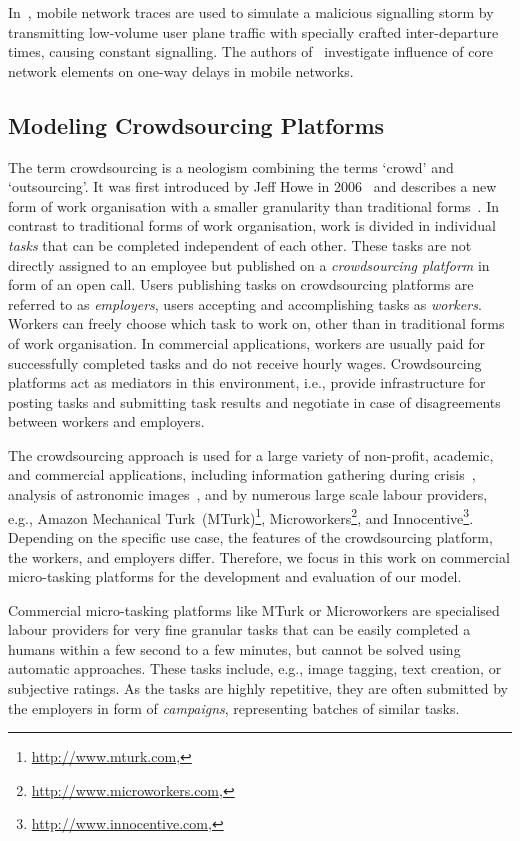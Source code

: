 In~\cite{Lee2007}, mobile network traces are used to simulate a malicious signalling storm by transmitting low-volume user plane traffic with specially crafted inter-departure times, causing constant signalling.
The authors of~\cite{Romirer-Maierhofer2008} investigate influence of core network elements on one-way delays in mobile networks.

\subsection{Modeling Crowdsourcing Platforms}
The term crowdsourcing is a neologism combining the terms `crowd' and `outsourcing'.
It was first introduced by Jeff Howe in 2006~\cite{Howe2006} and describes a new form of work organisation with a smaller granularity than traditional forms~\cite{Hossfeld2011c}.
In contrast to traditional forms of work organisation, work is divided in individual \emph{tasks} that can be completed independent of each other. 
These tasks are not directly assigned to an employee but published on a \emph{crowdsourcing platform} in form of an open call.
Users publishing tasks on crowdsourcing platforms are referred to as \emph{employers}, users accepting and accomplishing tasks as \emph{workers}.
Workers can freely choose which task to work on, other than in traditional forms of work organisation.
In commercial applications, workers are usually paid for successfully completed tasks and do not receive hourly wages.
Crowdsourcing platforms act as mediators in this environment, i.e., provide infrastructure for posting tasks and submitting task results and negotiate in case of disagreements between workers and employers.

The crowdsourcing approach is used for a large variety of non-profit, academic, and commercial applications, including information gathering during crisis~\cite{Morrow2011}, analysis of astronomic images~\cite{Raddick2010}, and by numerous large scale labour providers, e.g., Amazon Mechanical Turk~(MTurk)\footnote{\url{http://www.mturk.com}, \accessed}, Microworkers\footnote{\url{http://www.microworkers.com}, \accessed}, and Innocentive\footnote{\url{http://www.innocentive.com}, \accessed}.
Depending on the specific use case, the features of the crowdsourcing platform, the workers, and employers differ.
Therefore, we focus in this work on commercial micro-tasking platforms for the development and evaluation of our model.

Commercial micro-tasking platforms like MTurk or Microworkers are specialised labour providers for very fine granular tasks that can be easily completed a humans within a few second to a few minutes, but cannot be solved using automatic approaches. 
These tasks include, e.g., image tagging, text creation, or subjective ratings.
As the tasks are highly repetitive, they are often submitted by the employers in form of \emph{campaigns}, representing batches of similar tasks.

